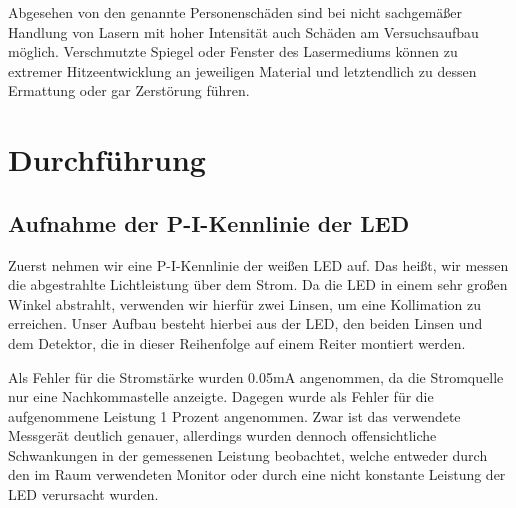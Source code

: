 \documentclass[bigchapter,colorback,accentcolor=tud4b,linedtoc,11pt]{tudreport}
\begin{document}
Abgesehen von den genannte Personenschäden sind bei nicht sachgemäßer Handlung von Lasern mit hoher Intensität auch Schäden am Versuchsaufbau möglich. Verschmutzte Spiegel oder Fenster des Lasermediums können zu extremer Hitzeentwicklung an jeweiligen Material und letztendlich zu dessen Ermattung oder gar Zerstörung führen.
\cite{GefahrenLaser}


\chapter{Durchführung}
\section{Aufnahme der P-I-Kennlinie der LED}
\label{sec:p-i-kennlinie}
Zuerst nehmen wir eine P-I-Kennlinie der weißen LED auf. Das heißt, wir messen die abgestrahlte Lichtleistung über dem Strom. Da die LED in einem sehr großen Winkel abstrahlt, verwenden wir hierfür zwei Linsen, um eine Kollimation zu erreichen. Unser Aufbau besteht hierbei aus der LED, den beiden Linsen und dem Detektor, die in dieser Reihenfolge auf einem Reiter montiert werden.

\begin{center}
\begin{figure}[h]
\end{figure}
\end{center}

Als Fehler für die Stromstärke wurden 0.05mA angenommen, da die Stromquelle nur eine Nachkommastelle anzeigte. Dagegen wurde als Fehler für die aufgenommene Leistung 1 Prozent angenommen. Zwar ist das verwendete Messgerät deutlich genauer, allerdings wurden dennoch offensichtliche Schwankungen in der gemessenen Leistung beobachtet, welche entweder durch den im Raum verwendeten Monitor oder durch eine nicht konstante Leistung der LED verursacht wurden.
\end{document}
